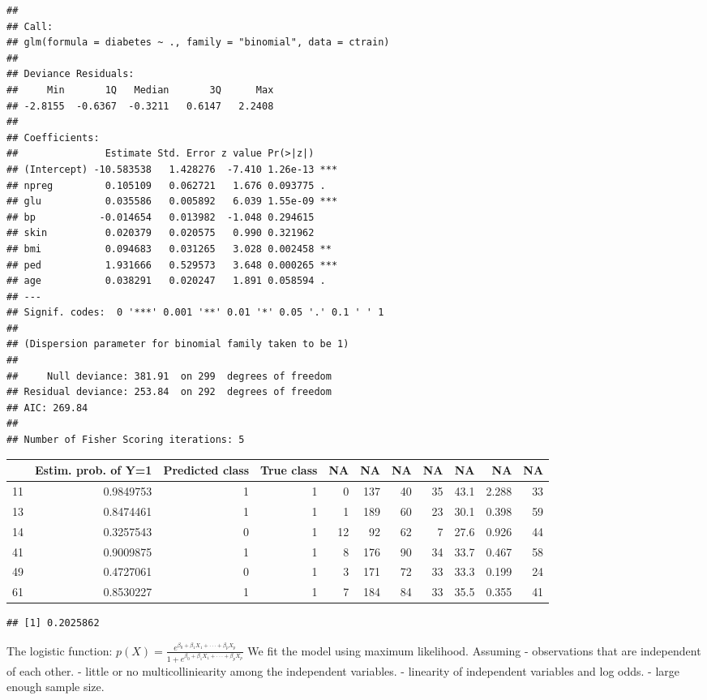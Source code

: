 \documentclass[]{article}
\begin{document}
\begin{verbatim}
## 
## Call:
## glm(formula = diabetes ~ ., family = "binomial", data = ctrain)
## 
## Deviance Residuals: 
##     Min       1Q   Median       3Q      Max  
## -2.8155  -0.6367  -0.3211   0.6147   2.2408  
## 
## Coefficients:
##               Estimate Std. Error z value Pr(>|z|)    
## (Intercept) -10.583538   1.428276  -7.410 1.26e-13 ***
## npreg         0.105109   0.062721   1.676 0.093775 .  
## glu           0.035586   0.005892   6.039 1.55e-09 ***
## bp           -0.014654   0.013982  -1.048 0.294615    
## skin          0.020379   0.020575   0.990 0.321962    
## bmi           0.094683   0.031265   3.028 0.002458 ** 
## ped           1.931666   0.529573   3.648 0.000265 ***
## age           0.038291   0.020247   1.891 0.058594 .  
## ---
## Signif. codes:  0 '***' 0.001 '**' 0.01 '*' 0.05 '.' 0.1 ' ' 1
## 
## (Dispersion parameter for binomial family taken to be 1)
## 
##     Null deviance: 381.91  on 299  degrees of freedom
## Residual deviance: 253.84  on 292  degrees of freedom
## AIC: 269.84
## 
## Number of Fisher Scoring iterations: 5
\end{verbatim}

\begin{longtable}[]{@{}lrrrrrrrrrr@{}}
\toprule
& Estim. prob. of Y=1 & Predicted class & True class & NA & NA & NA & NA
& NA & NA & NA\tabularnewline
\midrule
\endhead
11 & 0.9849753 & 1 & 1 & 0 & 137 & 40 & 35 & 43.1 & 2.288 &
33\tabularnewline
13 & 0.8474461 & 1 & 1 & 1 & 189 & 60 & 23 & 30.1 & 0.398 &
59\tabularnewline
14 & 0.3257543 & 0 & 1 & 12 & 92 & 62 & 7 & 27.6 & 0.926 &
44\tabularnewline
41 & 0.9009875 & 1 & 1 & 8 & 176 & 90 & 34 & 33.7 & 0.467 &
58\tabularnewline
49 & 0.4727061 & 0 & 1 & 3 & 171 & 72 & 33 & 33.3 & 0.199 &
24\tabularnewline
61 & 0.8530227 & 1 & 1 & 7 & 184 & 84 & 33 & 35.5 & 0.355 &
41\tabularnewline
\bottomrule
\end{longtable}

\begin{verbatim}
## [1] 0.2025862
\end{verbatim}

The logistic function:
\(p(X)=\frac{e^{\beta_0+\beta_1X_1+\cdot\cdot\cdot+\beta_pX_p}}{1+e^{\beta_0+\beta_1X_1+\cdot\cdot\cdot+\beta_pX_p}}\)
We fit the model using maximum likelihood. Assuming - observations that
are independent of each other. - little or no multicolliniearity among
the independent variables. - linearity of independent variables and log
odds. - large enough sample size.
\end{document}
